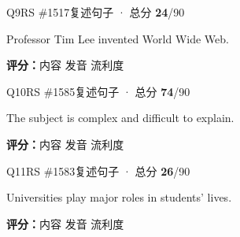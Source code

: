 \begin{qblock}{Q9\quad RS \#1517}{复述句子 · 总分 \textcolor{cAccent}{\bfseries 24}/90}
\begin{promptbox}
Professor Tim Lee invented World Wide Web.
\end{promptbox}
\asrlegend
\begin{asrbox}
      
\end{asrbox}
\smallskip
{\small\textbf{评分：}内容  \quad\textperiodcentered\quad 发音  \quad\textperiodcentered\quad 流利度 }
\end{qblock}

\begin{qblock}{Q10\quad RS \#1585}{复述句子 · 总分 \textcolor{cAccent}{\bfseries 74}/90}
\begin{promptbox}
The subject is complex and difficult to explain.
\end{promptbox}
\asrlegend
\begin{asrbox}
       
\end{asrbox}
\smallskip
{\small\textbf{评分：}内容  \quad\textperiodcentered\quad 发音  \quad\textperiodcentered\quad 流利度 }
\end{qblock}

\begin{qblock}{Q11\quad RS \#1583}{复述句子 · 总分 \textcolor{cAccent}{\bfseries 26}/90}
\begin{promptbox}
Universities play major roles in students' lives.
\end{promptbox}
\asrlegend
\begin{asrbox}
      
\end{asrbox}
\smallskip
{\small\textbf{评分：}内容  \quad\textperiodcentered\quad 发音  \quad\textperiodcentered\quad 流利度 }
\end{qblock}

